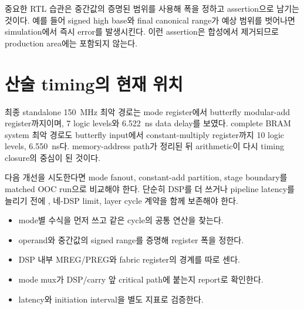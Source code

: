 중요한 RTL 습관은 중간값의 증명된 범위를 사용해 폭을 정하고 assertion으로
남기는 것이다. 예를 들어 signed high base와 final canonical range가 예상 범위를
벗어나면 simulation에서 즉시 error를 발생시킨다. 이런 assertion은 합성에서
제거되므로 production area에는 포함되지 않는다.

\section{산술 timing의 현재 위치}

최종 standalone 150~MHz 최악 경로는 mode register에서 butterfly modular-add
register까지이며, 7 logic levels와 6.522~ns data delay를 보였다. complete BRAM
system 최악 경로도 butterfly input에서 constant-multiply register까지 10 logic
levels, 6.550~ns다. memory-address path가 정리된 뒤 arithmetic이 다시 timing
closure의 중심이 된 것이다.

다음 개선을 시도한다면 mode fanout, constant-add partition, stage boundary를
matched OOC run으로 비교해야 한다. 단순히 DSP를 더 쓰거나 pipeline latency를
늘리기 전에 , 네-DSP limit, layer cycle 계약을 함께 보존해야 한다.

\begin{checklistbox}
\begin{itemize}
  \item mode별 수식을 먼저 쓰고 같은 cycle의 공통 연산을 찾는다.
  \item operand와 중간값의 signed range를 증명해 register 폭을 정한다.
  \item DSP 내부 MREG/PREG와 fabric register의 경계를 따로 센다.
  \item mode mux가 DSP/carry 앞 critical path에 붙는지 report로 확인한다.
  \item latency와 initiation interval을 별도 지표로 검증한다.
\end{itemize}
\end{checklistbox}
